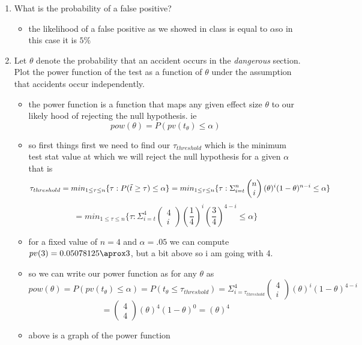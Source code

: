 \documentclass[12pt,twoside]{article}
\begin{document}
\begin{enumerate}
\begin{enumerate}
\item What is the probability of a false positive?
\begin{itemize}
    \color{blue}
    \item the likelihood of a false positive as we showed in class is equal to $\alpha$so in this case it is $5\%$ 
\end{itemize}
\item Let $\theta$ denote the probability that an accident occurs in the \emph{dangerous} section. Plot the power function of the test as a function of $\theta$ under the assumption that accidents occur independently. 
\begin{itemize}
    \color{blue}
    \item  the power function is a function that maps any given effect size $\theta$ to our likely hood of rejecting the null hypothesis. ie $$pow(\theta)=P(pv(t_{\theta})\leq \alpha) $$
\item so first things first we need to find our $\tau_{threshold}$ which is the minimum test stat value at which we will reject the null hypothesis for a given $\alpha$ that is $$\tau_{threshold}=min_{1\leq \tau\leq n}\{\tau:P(\Tilde{t}\geq \tau)\leq \alpha\}=min_{1\leq \tau\leq n}\{\tau:\Sigma_{i=t}^{n}\begin{pmatrix}n\\i\end{pmatrix}(\theta)^{i}(1-\theta)^{n-i}\leq \alpha\}$$$$=min_{1\leq \tau\leq n}\{\tau:\Sigma_{i=t}^{4}\begin{pmatrix}4\\i\end{pmatrix}(\frac{1}{4})^{i}(\frac{3}{4})^{4-i}\leq \alpha\}$$
\item for a fixed value of $n=4$ and $\alpha=.05$ we can compute $pv(3)=0.05078125\aprox 3$, but a bit above so i am going with 4. 
\item so we can write our power function as for any $\theta$ as  $$pow(\theta)=P(pv(t_{\theta})\leq \alpha)=P(t_{\theta}\leq \tau_{threshold})= \Sigma_{i=\tau_{threshold}}
^{4}\begin{pmatrix}4\\i\end{pmatrix}(\theta)^{i}(1-\theta)^{4-i}$$ $$=\begin{pmatrix}4\\4\end{pmatrix}(\theta)^{4}(1-\theta)^{0}=(\theta)^4$$

\item above is a graph of the power function 


\end{itemize}
\end{enumerate}
\end{enumerate}
\end{document}
